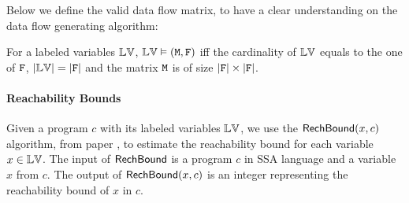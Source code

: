 %
Below we define the valid data flow matrix, to have a clear understanding on the data flow generating algorithm:
\begin{defn}
For a labeled variables $\mathbb{LV}$, $\mathbb{LV} \vDash (\mathtt{M},\mathtt{F})$ iff the cardinality of $\mathbb{LV}$ equals to the one of $\mathtt{F}$, $|\mathbb{LV}| = |\mathtt{F}|$ 
and the matrix $\mathtt{M}$ is of size $|\mathtt{F}| \times |\mathtt{F}|$.
\end{defn}
%
%
\paragraph{Reachability Bounds}
Given a program $c$ with its labeled variables $\mathbb{LV}$,
we use the $\mathsf{RechBound}({x}, {c})$ algorithm, from paper \cite{10.1145/1806596.1806630}, to estimate the reachability bound for each variable ${x} \in \mathbb{LV}$. 
The input of $\mathsf{RechBound}$ is a program ${c}$ in SSA language and a variable ${x} $ from ${c}$.
The output of $\mathsf{RechBound}({x}, {c})$ is an integer representing the reachability bound of ${x}$ in ${c}$.
%

